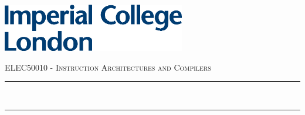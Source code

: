 \begin{titlepage}

    \newcommand{\HRule}{\rule{\linewidth}{0.5mm}} %


    \includegraphics[width=8cm]{cover/logo.eps}\\[1cm] %


    \center %


    \textsc{\LARGE ELEC50010 - Instruction Architectures and Compilers}\\[1cm] %

    \makeatletter
    \HRule \\[1em]
    { \huge \bfseries \@title} %
    \HRule \\[1em]





\end{titlepage}
